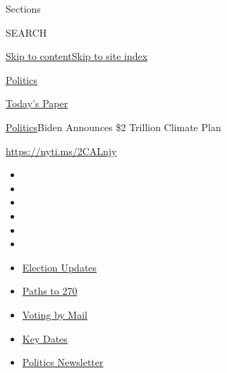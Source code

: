 Sections

SEARCH

\protect\hyperlink{site-content}{Skip to
content}\protect\hyperlink{site-index}{Skip to site index}

\href{https://www.nytimes3xbfgragh.onion/section/politics}{Politics}

\href{https://myaccount.nytimes3xbfgragh.onion/auth/login?response_type=cookie\&client_id=vi}{}

\href{https://www.nytimes3xbfgragh.onion/section/todayspaper}{Today's
Paper}

\href{/section/politics}{Politics}\textbar{}Biden Announces \$2 Trillion
Climate Plan

\url{https://nyti.ms/2CALnjy}

\begin{itemize}
\item
\item
\item
\item
\item
\item
\end{itemize}

\begin{itemize}
\item
  \href{https://www.nytimes3xbfgragh.onion/live/2020/09/07/us/trump-vs-biden?action=click\&pgtype=Article\&state=default\&region=TOP_BANNER\&context=storylines_menu}{Election
  Updates}
\item
  \href{https://www.nytimes3xbfgragh.onion/interactive/2020/us/elections/election-states-biden-trump.html?action=click\&pgtype=Article\&state=default\&region=TOP_BANNER\&context=storylines_menu}{Paths
  to 270}
\item
  \href{https://www.nytimes3xbfgragh.onion/interactive/2020/08/31/us/politics/vote-by-mail-deadlines.html?action=click\&pgtype=Article\&state=default\&region=TOP_BANNER\&context=storylines_menu}{Voting
  by Mail}
\item
  \href{https://www.nytimes3xbfgragh.onion/interactive/2019/us/elections/2020-presidential-election-calendar.html?action=click\&pgtype=Article\&state=default\&region=TOP_BANNER\&context=storylines_menu}{Key
  Dates}
\item
  \href{https://www.nytimes3xbfgragh.onion/newsletters/politics?action=click\&pgtype=Article\&state=default\&region=TOP_BANNER\&context=storylines_menu}{Politics
  Newsletter}
\end{itemize}

